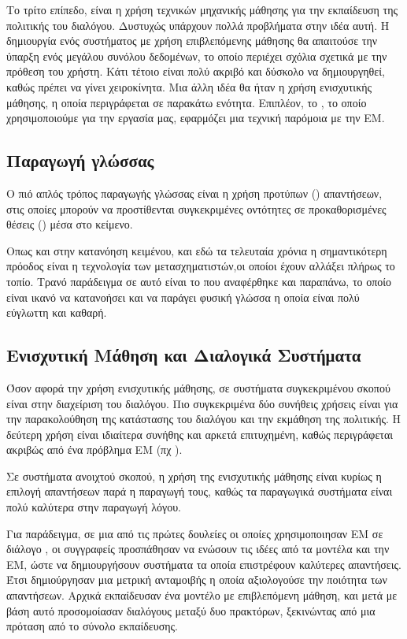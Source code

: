 Το τρίτο επίπεδο, είναι η χρήση τεχνικών μηχανικής μάθησης για την εκπαίδευση της πολιτικής του διαλόγου. Δυστυχώς υπάρχουν πολλά προβλήματα στην ιδέα αυτή. Η δημιουργία ενός συστήματος με χρήση επιβλεπόμενης μάθησης θα απαιτούσε την ύπαρξη ενός μεγάλου συνόλου δεδομένων, το οποίο περιέχει σχόλια σχετικά με την πρόθεση του χρήστη. Κάτι τέτοιο είναι πολύ ακριβό και δύσκολο να δημιουργηθεί, καθώς πρέπει να γίνει χειροκίνητα. Μια άλλη ιδέα θα ήταν η χρήση ενισχυτικής μάθησης, η οποία περιγράφεται σε παρακάτω ενότητα. Επιπλέον, το , το οποίο χρησιμοποιούμε για την εργασία μας, εφαρμόζει μια τεχνική παρόμοια με την ΕΜ.

\subsection{Παραγωγή γλώσσας}

Ο πιό απλός τρόπος παραγωγής γλώσσας είναι η χρήση προτύπων () απαντήσεων, στις οποίες μπορούν να προστίθενται συγκεκριμένες οντότητες σε προκαθορισμένες θέσεις () μέσα στο κείμενο.

Οπως και στην κατανόηση κειμένου, και εδώ τα τελευταία χρόνια η σημαντικότερη πρόοδος είναι η τεχνολογία των μετασχηματιστών,οι οποίοι έχουν αλλάξει πλήρως το τοπίο. Τρανό παράδειγμα σε αυτό είναι το  που αναφέρθηκε και παραπάνω, το οποίο είναι ικανό να κατανοήσει και να παράγει φυσική γλώσσα η οποία είναι πολύ εύγλωττη και καθαρή.

\subsection{Ενισχυτική Μάθηση και Διαλογικά Συστήματα}

Όσον αφορά την χρήση ενισχυτικής μάθησης, σε συστήματα συγκεκριμένου σκοπού είναι στην διαχείριση του διαλόγου. Πιο συγκεκριμένα δύο συνήθεις χρήσεις είναι για την παρακολούθηση της κατάστασης του διαλόγου και την εκμάθηση της πολιτικής. Η δεύτερη χρήση είναι ιδιαίτερα συνήθης και αρκετά επιτυχημένη, καθώς περιγράφεται ακριβώς από ένα πρόβλημα ΕΜ (πχ \cite{policy_learning_2019}).

Σε συστήματα ανοιχτού σκοπού, η χρήση της ενισχυτικής μάθησης είναι κυρίως η επιλογή απαντήσεων παρά η παραγωγή τους, καθώς τα παραγωγικά  συστήματα είναι πολύ καλύτερα στην παραγωγή λόγου.

Για παράδειγμα, σε μια από τις πρώτες δουλείες οι οποίες χρησιμοποιησαν ΕΜ σε διάλογο \cite{rl_dialogue_2016}, οι συγγραφείς προσπάθησαν να ενώσουν τις ιδέες από τα  μοντέλα και την ΕΜ, ώστε να δημιουργήσουν συστήματα τα οποία επιστρέφουν καλύτερες απαντήσεις. Έτσι δημιούργησαν μια μετρική ανταμοιβής η οποία αξιολογούσε την ποιότητα των απαντήσεων. Αρχικά εκπαίδευσαν ένα  μοντέλο με επιβλεπόμενη μάθηση, και μετά με βάση αυτό προσομοίασαν διαλόγους μεταξύ δυο πρακτόρων, ξεκινώντας από μια πρόταση από το σύνολο εκπαίδευσης.

